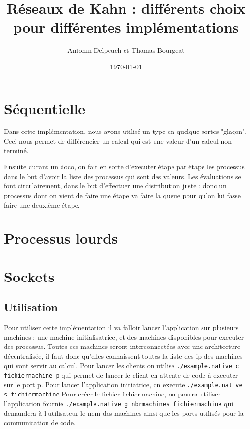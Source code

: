 \documentclass[a4paper]{article}
\begin{document}
\title{Réseaux de Kahn : différents choix pour différentes
implémentations }
\author{Antonin Delpeuch et Thomas Bourgeat}
\date{\today}

\maketitle

\section{Séquentielle}
Dans cette implémentation, nous avons utilisé un type en quelque sortes "glaçon". Ceci
nous permet de différencier un calcul qui est une valeur d'un calcul
non-terminé.

Ensuite durant un doco, on fait en sorte d'executer étape par étape les
processus dans le but d'avoir la liste des processus qui sont des
valeurs. Les évaluations se font circulairement, dans le but d'effectuer
une distribution juste : donc un processus dont on vient de faire une
étape va faire la queue pour qu'on lui fasse faire une deuxième étape.
 

\section{Processus lourds}
\section{Sockets}
\subsection{Utilisation}
Pour utiliser cette implémentation il va falloir lancer 
l'application sur plusieurs machines : une machine initialisatrice, et
des machines disponibles pour executer des processus. Toutes ces machines seront
interconnectées avec une architecture décentralisée, il faut donc
qu'elles connaissent toutes la liste des ip des machines qui vont servir
au calcul.
Pour lancer les clients on utilise \texttt{./example.native c
fichiermachine p} qui
permet de lancer le client en attente de code à executer sur le port p.
Pour lancer l'application initiatrice, on execute \texttt{./example.native s
fichiermachine}
Pour créer le fichier fichiermachine, on pourra utiliser l'application
fournie \texttt{./example.native g nbrmachines fichiermachine} qui demandera à
l'utilisateur le nom des machines ainsi que les ports utilisés pour la
communication de code.
\end{document}
